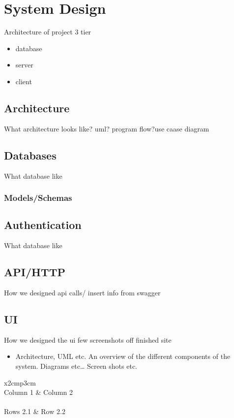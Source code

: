\chapter{System Design}
Architecture of project 3 tier
\begin{itemize}
\item database
\item server
\item client
\end{itemize}

\section{Architecture}
What architecture looks like?
uml?
program flow?use caase diagram

\section{Databases}
What database like

\subsection{Models/Schemas}

\section{Authentication}
What database like

\section{API/HTTP}
How we designed api calls/
insert info from swagger

\section{UI}
How we designed the ui
few screenshots off finished site


\begin{itemize}
\item Architecture, UML etc. An overview of the different components of the system. Diagrams etc… Screen shots etc.
\end{itemize}

\begin{table}[h]
  \centering
  \begin{tabular}{x{2cm}p{3cm}}
    \toprule \\
    Column 1 & Column 2 \\
    \midrule \\
    Rows 2.1 & Row 2.2 \\
    \bottomrule
  \end{tabular}
  \caption{A table.}
  \label{table:mytable}
\end{table}